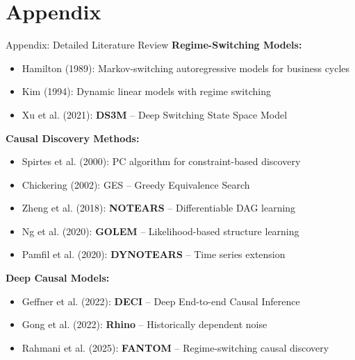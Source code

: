 \documentclass[aspectratio=169]{beamer}
\begin{document}
\appendix
\section{Appendix}

\begin{frame}{Appendix: Detailed Literature Review}
\textbf{Regime-Switching Models:}
\begin{itemize}
    \item Hamilton (1989): Markov-switching autoregressive models for business cycles
    \item Kim (1994): Dynamic linear models with regime switching
    \item Xu et al. (2021): \textbf{DS3M} -- Deep Switching State Space Model
\end{itemize}

\vspace{0.2cm}
\textbf{Causal Discovery Methods:}
\begin{itemize}
    \item Spirtes et al. (2000): PC algorithm for constraint-based discovery
    \item Chickering (2002): GES -- Greedy Equivalence Search
    \item Zheng et al. (2018): \textbf{NOTEARS} -- Differentiable DAG learning
    \item Ng et al. (2020): \textbf{GOLEM} -- Likelihood-based structure learning
    \item Pamfil et al. (2020): \textbf{DYNOTEARS} -- Time series extension
\end{itemize}

\vspace{0.2cm}
\textbf{Deep Causal Models:}
\begin{itemize}
    \item Geffner et al. (2022): \textbf{DECI} -- Deep End-to-end Causal Inference
    \item Gong et al. (2022): \textbf{Rhino} -- Historically dependent noise
    \item Rahmani et al. (2025): \textbf{FANTOM} -- Regime-switching causal discovery
\end{itemize}
\end{frame}
\end{document}
